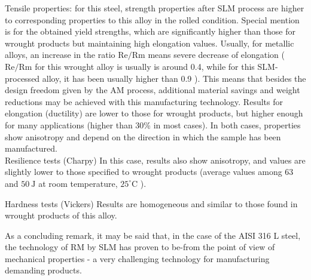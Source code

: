 \documentclass[10pt]{article}
\begin{document}
Tensile properties: for this steel, strength properties after SLM process are higher to corresponding properties to this alloy in the rolled condition. Special mention is for the obtained yield strengths, which are significantly higher than those for wrought products but maintaining high elongation values. Usually, for metallic alloys, an increase in the ratio $\mathrm{Re} / \mathrm{Rm}$ means severe decrease of elongation ( $\mathrm{Re} / \mathrm{Rm}$ for this wrought alloy is usually is around 0.4, while for this SLM-processed alloy, it has been usually higher than 0.9 ). This means that besides the design freedom given by the AM process, additional material savings and weight reductions may be achieved with this manufacturing technology. Results for elongation (ductility) are lower to those for wrought products, but higher enough for many applications (higher than 30\% in most cases). In both cases, properties show anisotropy and depend on the direction in which the sample has been manufactured.\\
Resilience tests (Charpy) In this case, results also show anisotropy, and values are slightly lower to those specified to wrought products (average values among 63 and $50 \mathrm{~J}$ at room temperature, $25^{\circ} \mathrm{C}$ ).

Hardness tests (Vickers) Results are homogeneous and similar to those found in wrought products of this alloy.

As a concluding remark, it may be said that, in the case of the AISI 316 L steel, the technology of RM by SLM has proven to be-from the point of view of mechanical properties - a very challenging technology for manufacturing demanding products.
\end{document}
